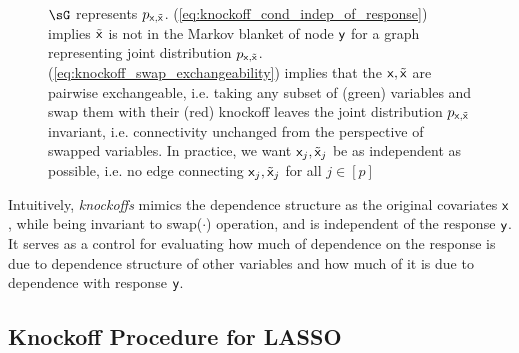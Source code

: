 \documentclass[11pt]{article}
\begin{document}
\begin{figure}[h!]
    \caption{$\sG$ represents $p_{\mathsf{x},\tilde{\mathsf{x}}}$. (\ref{eq:knockoff_cond_indep_of_response}) implies $\tilde{\mathsf{x}}$ is not in the Markov blanket of node $\mathsf{y}$ for a graph representing joint distribution $p_{\mathsf{x},\tilde{\mathsf{x}}}$. (\ref{eq:knockoff_swap_exchangeability}) implies that the $\mathsf{x},\tilde{\mathsf{x}}$ are pairwise exchangeable, i.e. taking any subset of (green) variables and swap them with their (red) knockoff leaves the joint distribution $p_{\mathsf{x},\tilde{\mathsf{x}}}$ invariant, i.e. connectivity unchanged from the perspective of swapped variables. In practice, we want $\mathsf{x}_j,\tilde{\mathsf{x}}_j$ be as independent as possible, i.e. no edge connecting $\mathsf{x}_j,\tilde{\mathsf{x}}_j$ for all $j\in[p]$}
\end{figure}
\noindent Intuitively, \textit{knockoffs} mimics the dependence structure as the original covariates $\mathsf{x}$, while being invariant to \textsf{swap($\cdot$)} operation, and is independent of the response $\mathsf{y}$. It serves as a control for evaluating how much of dependence on the response is due to dependence structure of other variables and how much of it is due to dependence with response $\mathsf{y}$.
  

\subsection{Knockoff Procedure for LASSO}
\end{document}
